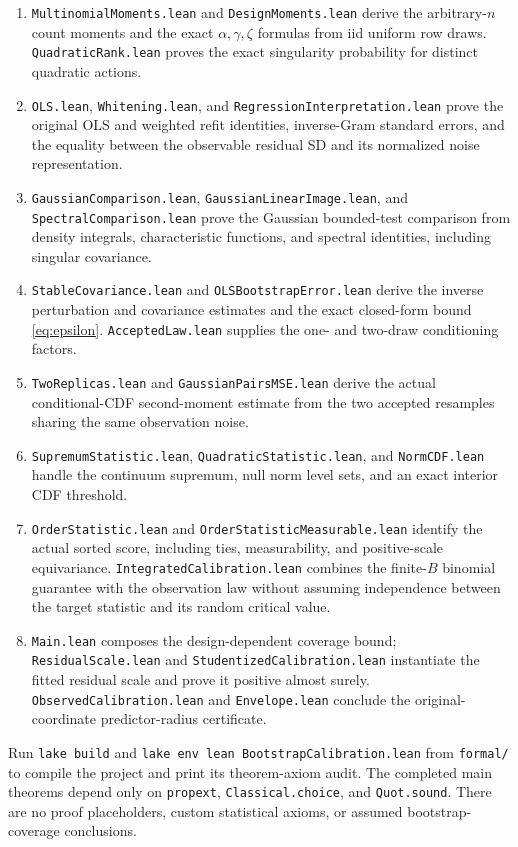 \documentclass[11pt]{article}
\begin{document}
\begin{enumerate}
\item \texttt{MultinomialMoments.lean} and \texttt{DesignMoments.lean}
derive the arbitrary-$n$ count moments and the exact $\alpha,\gamma,\zeta$
formulas from iid uniform row draws. \texttt{QuadraticRank.lean} proves
the exact singularity probability for distinct quadratic actions.
\item \texttt{OLS.lean}, \texttt{Whitening.lean}, and
\texttt{RegressionInterpretation.lean} prove the original OLS and weighted
refit identities, inverse-Gram standard errors, and the equality between
the observable residual SD and its normalized noise representation.
\item \texttt{GaussianComparison.lean}, \texttt{GaussianLinearImage.lean},
and \texttt{SpectralComparison.lean} prove the Gaussian bounded-test
comparison from density integrals, characteristic functions, and spectral
identities, including singular covariance.
\item \texttt{StableCovariance.lean} and \texttt{OLSBootstrapError.lean}
derive the inverse perturbation and covariance estimates and the exact
closed-form bound \eqref{eq:epsilon}. \texttt{AcceptedLaw.lean} supplies
the one- and two-draw conditioning factors.
\item \texttt{TwoReplicas.lean} and \texttt{GaussianPairsMSE.lean}
derive the actual conditional-CDF second-moment estimate from the two
accepted resamples sharing the same observation noise.
\item \texttt{SupremumStatistic.lean}, \texttt{QuadraticStatistic.lean},
and \texttt{NormCDF.lean} handle the continuum supremum, null norm level
sets, and an exact interior CDF threshold.
\item \texttt{OrderStatistic.lean} and
\texttt{OrderStatisticMeasurable.lean} identify the actual sorted score,
including ties, measurability, and positive-scale equivariance.
\texttt{IntegratedCalibration.lean} combines the finite-$B$ binomial
guarantee with the observation law without assuming independence between
the target statistic and its random critical value.
\item \texttt{Main.lean} composes the design-dependent coverage bound;
\texttt{ResidualScale.lean} and \texttt{StudentizedCalibration.lean}
instantiate the fitted residual scale and prove it positive almost surely.
\texttt{ObservedCalibration.lean} and \texttt{Envelope.lean} conclude the
original-coordinate predictor-radius certificate.
\end{enumerate}
Run \texttt{lake build} and
\texttt{lake env lean BootstrapCalibration.lean} from \texttt{formal/}
to compile the project and print its theorem-axiom audit. The completed main
theorems depend only on \texttt{propext}, \texttt{Classical.choice}, and
\texttt{Quot.sound}. There are no proof placeholders, custom statistical
axioms, or assumed bootstrap-coverage conclusions.
\end{document}
